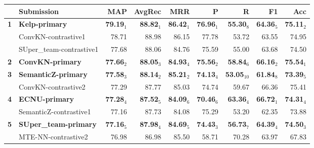 \begin{table*}[tbh]
\begin{center}
\begin{tabular}{clrrrrrrr}
& \bf Submission & \bf MAP & \bf \scriptsize AvgRec & \bf \scriptsize MRR & \bf \scriptsize P & \bf \scriptsize R & \bf \scriptsize F1 & \bf \scriptsize Acc\\
\hline
\bf 1 & \bf Kelp-primary & \bf 79.19$_{1}$ & \bf \scriptsize 88.82$_{1}$ & \bf \scriptsize 86.42$_{1}$ & \bf \scriptsize 76.96$_{1}$ & \bf \scriptsize 55.30$_{8}$ & \bf \scriptsize 64.36$_{5}$ & \bf \scriptsize 75.11$_{2}$ \\
& ConvKN-contrastive1 & 78.71 & \scriptsize 88.98 & \scriptsize 86.15 & \scriptsize 77.78 & \scriptsize 53.72 & \scriptsize 63.55 & \scriptsize 74.95 \\
& SUper\_team-contrastive1 & 77.68 & \scriptsize 88.06 & \scriptsize 84.76 & \scriptsize 75.59 & \scriptsize 55.00 & \scriptsize 63.68 & \scriptsize 74.50 \\
\bf 2 & \bf ConvKN-primary & \bf 77.66$_{2}$ & \bf \scriptsize 88.05$_{3}$ & \bf \scriptsize 84.93$_{4}$ & \bf \scriptsize 75.56$_{2}$ & \bf \scriptsize 58.84$_{6}$ & \bf \scriptsize 66.16$_{2}$ & \bf \scriptsize 75.54$_{1}$ \\
\bf 3 & \bf SemanticZ-primary & \bf 77.58$_{3}$ & \bf \scriptsize 88.14$_{2}$ & \bf \scriptsize 85.21$_{2}$ & \bf \scriptsize 74.13$_{4}$ & \bf \scriptsize 53.05$_{10}$ & \bf \scriptsize 61.84$_{8}$ & \bf \scriptsize 73.39$_{5}$ \\
& ConvKN-contrastive2 & 77.29 & \scriptsize 87.77 & \scriptsize 85.03 & \scriptsize 74.74 & \scriptsize 59.67 & \scriptsize 66.36 & \scriptsize 75.41 \\
\bf 4 & \bf ECNU-primary & \bf 77.28$_{4}$ & \bf \scriptsize 87.52$_{5}$ & \bf \scriptsize 84.09$_{6}$ & \bf \scriptsize 70.46$_{6}$ & \bf \scriptsize 63.36$_{4}$ & \bf \scriptsize 66.72$_{1}$ & \bf \scriptsize 74.31$_{4}$ \\
& SemanticZ-contrastive1 & 77.16 & \scriptsize 87.73 & \scriptsize 84.08 & \scriptsize 75.29 & \scriptsize 53.20 & \scriptsize 62.35 & \scriptsize 73.88 \\
\bf 5 & \bf SUper\_team-primary & \bf 77.16$_{5}$ & \bf \scriptsize 87.98$_{4}$ & \bf \scriptsize 84.69$_{5}$ & \bf \scriptsize 74.43$_{3}$ & \bf \scriptsize 56.73$_{7}$ & \bf \scriptsize 64.39$_{4}$ & \bf \scriptsize 74.50$_{3}$ \\
& MTE-NN-contrastive2 & 76.98 & \scriptsize 86.98 & \scriptsize 85.50 & \scriptsize 58.71 & \scriptsize 70.28 & \scriptsize 63.97 & \scriptsize 67.83 \\

\end{tabular}
\end{center}
\end{table*}
